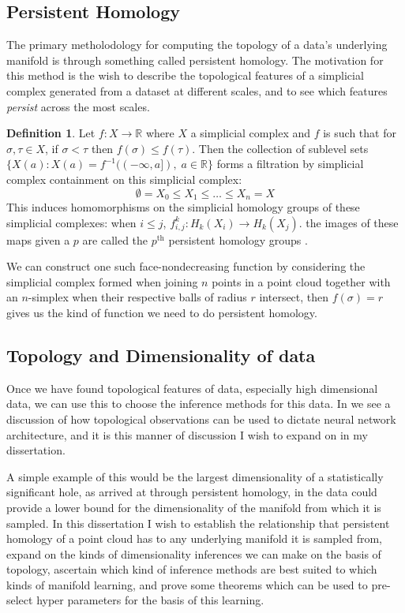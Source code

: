 \documentclass[a4paper,12pt]{report}
\theoremstyle{definition}
\newtheorem{definition}{Definition}[chapter]
\begin{document}
 \subsection*{Persistent Homology}
 The primary metholodology for computing the topology of a data's underlying manifold is through something called persistent homology. The motivation for this method is the wish to describe the topological features of a simplicial complex generated from a dataset at different scales, and to see which features {\em persist} across the most scales.
 
 \begin{definition}
 Let $f:X \rightarrow \mathbb{R}$ where $X$ a simplicial complex and $f$ is such that for $\sigma, \tau \in X$, if $\sigma < \tau$ then $f(\sigma)\leq f(\tau)$. Then the collection of sublevel sets $\{X(a): X(a) = f^{-1}((-\infty,a]), \; a \in \mathbb{R}\}$ forms a filtration by simplicial complex containment on this simplicial complex: $$\emptyset = X_0 \leq X_1 \leq \dots \leq X_n = X$$
 This induces homomorphisms on the simplicial homology groups of these simplicial complexes: when $i\leq j$,  $f^k_{i,j}: H_k(X_i)\rightarrow H_k(X_j)$. the images of these maps given a $p$ are called the $p^{\textrm{th}}$ persistent homology groups \cite{persistence}.
 
 We can construct one such face-nondecreasing function by considering the simplicial complex formed when joining $n$ points in a point cloud together with an $n$-simplex when their respective balls of radius $r$ intersect, then $f(\sigma) = r$  gives us the kind of function we need to do persistent homology. 
 \end{definition}
 \subsection*{Topology and Dimensionality of data}
 Once we have found topological features of data, especially high dimensional data, we can use this to choose the inference methods for this data. In \cite{NNTop} we see a discussion of how topological observations can be used to dictate neural network architecture, and it is this manner of discussion I wish to expand on in my dissertation.
 
 A simple example of this would be the largest dimensionality of a statistically significant hole, as arrived at through persistent homology, in the data could provide a lower bound for the dimensionality of the manifold from which it is sampled. In this dissertation I wish to establish the relationship that persistent homology of a point cloud has to any underlying manifold it is sampled from, expand on the kinds of dimensionality inferences we can make on the basis of topology, ascertain which kind of inference methods are best suited to which kinds of manifold learning, and prove some theorems which can be used to pre-select hyper parameters for the basis of this learning.
 
\end{document}
